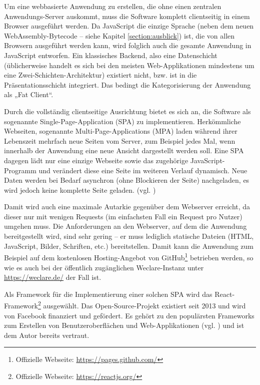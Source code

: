 Um eine webbasierte Anwendung zu erstellen, die ohne einen zentralen Anwendungs-Server auskommt, muss die Software komplett clientseitig in einem Browser ausgeführt werden. Da JavaScript die einzige Sprache (neben dem neuen WebAssembly-Bytecode – siehe Kapitel \ref{section:ausblick}) ist, die von allen Browsern ausgeführt werden kann, wird folglich auch die gesamte Anwendung in JavaScript entworfen. Ein klassisches Backend, also eine Datenschicht (üblicherweise handelt es sich bei den meisten Web-Applikationen mindestens um eine Zwei-Schichten-Architektur) existiert nicht, bzw. ist in die Präsentationsschicht integriert. Das bedingt die Kategorisierung der Anwendung als „Fat Client“.

Durch die vollständig clientseitige Ausrichtung bietet es sich an, die Software als sogenannte Single-Page-Application (SPA) zu implementieren. Herkömmliche Webseiten, sogenannte Multi-Page-Applications (MPA) laden während ihrer Lebenszeit mehrfach neue Seiten vom Server, zum Beispiel jedes Mal, wenn innerhalb der Anwendung eine neue Ansicht dargestellt werden soll. Eine SPA dagegen lädt nur eine einzige Webseite sowie das zugehörige JavaScript-Programm und verändert diese eine Seite im weiteren Verlauf dynamisch. Neue Daten werden bei Bedarf asynchron (ohne Blockieren der Seite) nachgeladen, es wird jedoch keine komplette Seite geladen. (vgl. \cite[S. 1]{art:single_page_multi_page})

Damit wird auch eine maximale Autarkie gegenüber dem Webserver erreicht, da dieser nur mit wenigen Requests (im einfachsten Fall ein Request pro Nutzer) umgehen muss. Die Anforderungen an den Webserver, auf dem die Anwendung bereitgestellt wird, sind sehr gering – er muss lediglich statische Dateien (HTML, JavaScript, Bilder, Schriften, etc.) bereitstellen. Damit kann die Anwendung zum Beispiel auf dem kostenlosen Hosting-Angebot von GitHub\footnote{Offizielle Webseite: \url{https://pages.github.com/}} betrieben werden, so wie es auch bei der öffentlich zugänglichen Weclare-Instanz unter \url{https://weclare.de/} der Fall ist.

Als Framework für die Implementierung einer solchen SPA wird das React-Framework\footnote{Offizielle Webseite: \url{https://reactjs.org/}} ausgewählt. Das Open-Source-Projekt existiert seit 2013 und wird von Facebook finanziert und gefördert. Es gehört zu den populärsten Frameworks zum Erstellen von Benutzeroberflächen und Web-Applikationen (vgl. \cite{web:stackoverflow_umfrage}) und ist dem Autor bereits vertraut.


